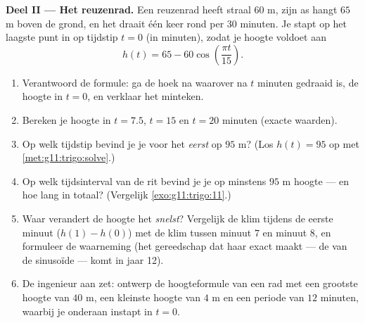 \begin{problem}
\medskip
\noindent\textbf{Deel II --- Het reuzenrad.}
Een reuzenrad heeft straal $60$ m, zijn as hangt $65$ m boven de grond, en
het draait één keer rond per $30$ minuten. Je stapt op het laagste punt in op
tijdstip $t = 0$ (in minuten), zodat je hoogte voldoet aan
\[
h(t) = 65 - 60 \cos\!\left(\frac{\pi t}{15}\right).
\]
\begin{enumerate}[resume]
  \item Verantwoord de formule: ga de hoek na waarover na $t$ minuten
        gedraaid is, de hoogte in $t = 0$, en verklaar het minteken.
  \item Bereken je hoogte in $t = 7.5$, $t = 15$ en $t = 20$ minuten (exacte
        waarden).
  \item Op welk tijdstip bevind je je voor het \emph{eerst} op $95$ m? (Los
        $h(t) = 95$ op met \cref{met:g11:trigo:solve}.)
  \item Op welk tijdsinterval van de rit bevind je je op minstens $95$ m
        hoogte --- en hoe lang in totaal? (Vergelijk \cref{exo:g11:trigo:11}.)
  \item Waar verandert de hoogte het \emph{snelst}? Vergelijk de klim tijdens
        de eerste minuut ($h(1) - h(0)$) met de klim tussen minuut $7$ en
        minuut $8$, en formuleer de waarneming (het gereedschap dat haar
        exact maakt --- de  van de sinusoïde --- komt in jaar 12).
  \item De ingenieur aan zet: ontwerp de hoogteformule van een rad met een
        grootste hoogte van $40$ m, een kleinste hoogte van $4$ m en een
        periode van $12$ minuten, waarbij je onderaan instapt in $t = 0$.
\end{enumerate}


\end{problem}
